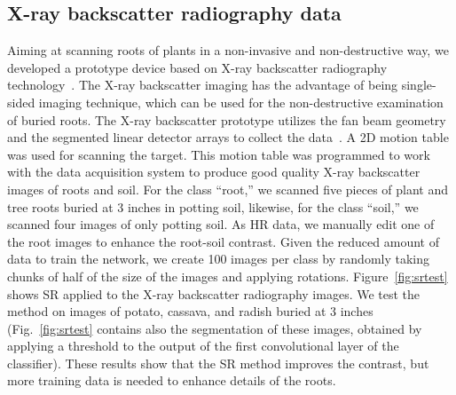 \documentclass[10pt,twocolumn,letterpaper]{article}
\begin{document}
\subsection{X-ray backscatter radiography data}

Aiming at scanning roots of plants in a non-invasive and non-destructive way, we developed a prototype device based on X-ray backscatter radiography technology~\cite{Kelley2019}. The X-ray backscatter imaging has the advantage of being single-sided imaging technique, which can be used for the non-destructive examination of buried roots. The X-ray backscatter prototype utilizes the fan beam geometry and the segmented linear detector arrays to collect the data~\cite{Cui2017}. A 2D motion table was used for scanning the target. This motion table was programmed to work with the data acquisition system to produce good quality X-ray backscatter images of roots and soil. For the class ``root,'' we scanned five pieces of plant and tree roots buried at 3 inches in potting soil, likewise, for the class ``soil,'' we scanned four images of only potting soil. As HR data, we manually edit one of the root images to enhance the root-soil contrast. Given the reduced amount of data to train the network, we create 100 images per class by randomly taking chunks of half of the size of the images and applying rotations. Figure~\ref{fig:srtest} shows SR applied to the X-ray backscatter radiography images. We test the method on images of potato, cassava, and radish buried at 3 inches (Fig.~\ref{fig:srtest} contains also the segmentation of these images, obtained by applying a threshold to the output of the first convolutional layer of the classifier). These results show that the SR method improves the contrast, but more training data is needed to enhance details of the roots.
\end{document}
